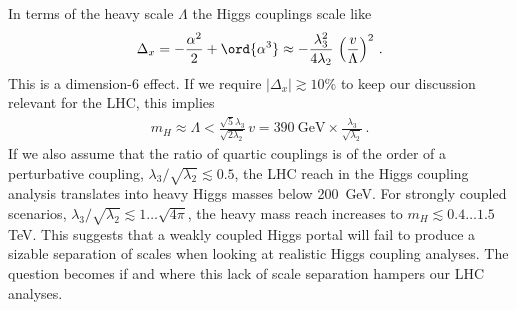 In terms of the heavy scale $\Lambda$ the Higgs couplings scale like
%
\begin{align} \Delta_x = - \frac{\alpha^2}{2} + \ord{\alpha^3}
\approx - \frac{\lambda_3^2}{4 \lambda_2}\, \left( \frac{v}{\Lambda}
\right)^2 \,.
\label{eq:singlet_decoup}
\end{align}
%
This is a dimension-6 effect.  If we require $|\Delta_x| \gtrsim 10\%$
to keep our discussion relevant for the LHC, this implies
%
\begin{align} m_H \approx \Lambda < \frac{\sqrt{5} \lambda_3}{\sqrt{2
\lambda_2}} \, v = 390~\text{GeV} \times
\frac{\lambda_3}{\sqrt{\lambda_2}} \,.
 \label{eq:singlet-delta3}
\end{align}
%
If we also assume that the ratio of quartic couplings is of the order
of a perturbative coupling, $\lambda_3/\sqrt{\lambda_2} \lesssim 0.5$,
the LHC reach in the Higgs coupling analysis translates into heavy
Higgs masses below 200~GeV. For strongly coupled scenarios,
$\lambda_3/\sqrt{\lambda_2} \lesssim 1 \dots \sqrt{4\pi}$, the heavy
mass reach increases to $m_H \lesssim 0.4 \dots 1.5$ TeV.  This
suggests that a weakly coupled Higgs portal will fail to produce a
sizable separation of scales when looking at realistic Higgs coupling
analyses. The question becomes if and where this lack of scale
separation hampers our LHC analyses.\medskip


